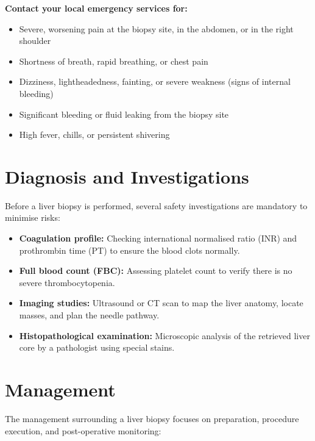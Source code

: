 \textbf{Contact your local emergency services for:}
\begin{itemize}
    \item Severe, worsening pain at the biopsy site, in the abdomen, or in the right shoulder
    \item Shortness of breath, rapid breathing, or chest pain
    \item Dizziness, lightheadedness, fainting, or severe weakness (signs of internal bleeding)
    \item Significant bleeding or fluid leaking from the biopsy site
    \item High fever, chills, or persistent shivering
\end{itemize}

\section*{Diagnosis and Investigations}
Before a liver biopsy is performed, several safety investigations are mandatory to minimise risks:

\begin{itemize}
    \item \textbf{Coagulation profile:} Checking international normalised ratio (INR) and prothrombin time (PT) to ensure the blood clots normally.
    \item \textbf{Full blood count (FBC):} Assessing platelet count to verify there is no severe thrombocytopenia.
    \item \textbf{Imaging studies:} Ultrasound or CT scan to map the liver anatomy, locate masses, and plan the needle pathway.
    \item \textbf{Histopathological examination:} Microscopic analysis of the retrieved liver core by a pathologist using special stains.
\end{itemize}

\section*{Management}
The management surrounding a liver biopsy focuses on preparation, procedure execution, and post-operative monitoring:

